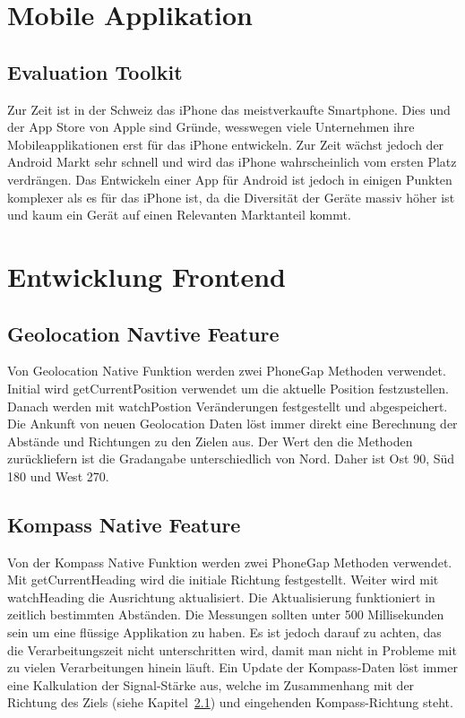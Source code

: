 
\newpage
\section{Mobile Applikation} %
\label{sec:Mobile Applikation}

\subsection{Evaluation Toolkit} %
\label{sub:Evaluation Toolkit}
Zur Zeit ist in der Schweiz das iPhone das meistverkaufte Smartphone. Dies und der App Store von Apple sind Gründe, wesswegen viele Unternehmen ihre Mobileapplikationen erst für das iPhone entwickeln. Zur Zeit wächst jedoch der Android Markt sehr schnell und wird das iPhone wahrscheinlich vom ersten Platz verdrängen. Das Entwickeln einer App für Android ist jedoch in einigen Punkten komplexer als es für das iPhone ist, da die Diversität der Geräte massiv höher ist und kaum ein Gerät auf einen Relevanten Marktanteil kommt.

\section{Entwicklung Frontend} %
\label{sec:entwicklung_frontend}

\subsection{Geolocation Navtive Feature} %
\label{sub:geolocation_native_feature}
Von Geolocation Native Funktion werden zwei PhoneGap Methoden verwendet. Initial wird getCurrentPosition verwendet um die aktuelle Position festzustellen. Danach werden mit watchPostion Veränderungen festgestellt und abgespeichert. Die Ankunft von neuen Geolocation Daten löst immer direkt eine Berechnung der Abstände und Richtungen zu den Zielen aus. Der Wert den die Methoden zurückliefern ist die Gradangabe unterschiedlich von Nord. Daher ist Ost 90, Süd 180 und West 270.

\subsection{Kompass Native Feature} %
\label{sub:kompass_native_feature}
Von der Kompass Native Funktion werden zwei PhoneGap Methoden verwendet. Mit getCurrentHeading wird die initiale Richtung festgestellt. Weiter wird mit watchHeading die Ausrichtung aktualisiert. Die Aktualisierung funktioniert in zeitlich bestimmten Abständen. Die Messungen sollten unter 500 Millisekunden sein um eine flüssige Applikation zu haben. Es ist jedoch darauf zu achten, das die Verarbeitungszeit nicht unterschritten wird, damit man nicht in Probleme mit zu vielen Verarbeitungen hinein läuft. Ein Update der Kompass-Daten löst immer eine Kalkulation der Signal-Stärke aus, welche im Zusammenhang mit der Richtung des Ziels (siehe Kapitel~\ref{sub:geolocation_native_feature}) und eingehenden Kompass-Richtung steht.

